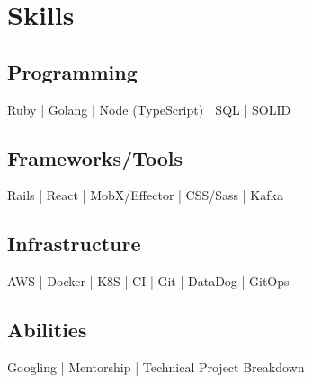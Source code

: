 \section{Skills}
  \subsection{Programming}
  Ruby | Golang | Node (TypeScript) | SQL | SOLID  \\
  \subsection{Frameworks/Tools}
  Rails | React | MobX/Effector | CSS/Sass | Kafka \\
  \subsection{Infrastructure}
  AWS | Docker | K8S | CI | Git | DataDog | GitOps \\
  \subsection{Abilities}
  Googling | Mentorship | Technical Project Breakdown
